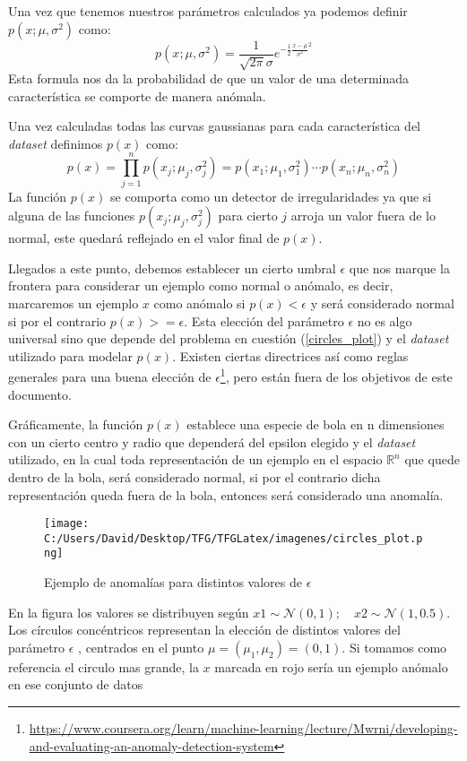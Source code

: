 Una vez que tenemos nuestros parámetros calculados ya podemos definir $p(x;\mu,\sigma^2)$ como:
$$ p(x;\mu,\sigma^2) = \frac{1}{\sqrt{2\pi}\sigma}e^{-\frac{1}{2}\frac{x-\mu}{\sigma^2}^2}$$
Esta formula nos da la probabilidad de que un valor de una determinada característica se 
comporte de manera anómala.

\clearpage

Una vez calculadas todas las curvas gaussianas para cada característica del \textit{dataset} definimos $p(x)$ como:
$$ p(x) = \prod_{j=1}^n p(x_j;\mu_j,\sigma_j^2)= p(x_1; \mu_1, \sigma_1^2) \cdots  p(x_n; \mu_n, \sigma_n^2)$$
La función $p(x)$ se comporta como un detector de irregularidades ya que si alguna de las funciones 
$p(x_j;\mu_j,\sigma_j^2)$ para cierto $j$ arroja un valor fuera de lo normal, este quedará reflejado 
en el valor final de $p(x)$.

Llegados a este punto, debemos establecer un cierto umbral $\epsilon$ que nos marque la frontera 
para considerar un ejemplo como normal o anómalo, es decir, marcaremos un ejemplo $x$ como anómalo si 
$p(x)<\epsilon$ y será considerado normal si por el contrario $p(x)>=\epsilon$.
Esta elección del parámetro $\epsilon$ no es algo universal sino que depende del problema en cuestión 
(\autoref{circles_plot}) y el \textit{dataset} utilizado para modelar $p(x)$.
Existen ciertas directrices así como reglas generales para una buena elección de 
$\epsilon$\footnote{\url{https://www.coursera.org/learn/machine-learning/lecture/Mwrni/developing-and-evaluating-an-anomaly-detection-system}}, 
pero están fuera de los objetivos de este documento.
\newline
  
Gráficamente, la función $p(x)$ establece una especie de bola en n dimensiones con un cierto centro 
y radio que dependerá del epsilon elegido y el \textit{dataset} utilizado, en la cual toda representación 
de un ejemplo en el espacio $\mathds{R}^n$ que quede dentro de la bola, será considerado normal, 
si por el contrario dicha representación queda fuera de la bola, entonces será considerado una 
anomalía.

\begin{figure}[h]
  \centering
  \texttt{[image: C:/Users/David/Desktop/TFG/TFGLatex/imagenes/circles\_plot.png]}
  \caption[Ejemplo de anomalía]{Ejemplo de anomalías para distintos valores de $\epsilon$}
  \label{circles_plot}
\end{figure}

En la figura los valores se distribuyen según
$x1 \sim \mathcal{N}(0, 1); \quad x2 \sim \mathcal{N}(1, 0.5)$.
Los círculos concéntricos representan la elección de distintos valores del parámetro $\epsilon$ ,
centrados en el punto $\mu=(\mu_1, \mu_2)=(0, 1)$.
Si tomamos como referencia el circulo mas grande, la $x$ marcada en rojo sería un ejemplo anómalo 
en ese conjunto de datos

